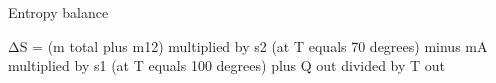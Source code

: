 Entropy balance  

ΔS = (m total plus m12) multiplied by s2 (at T equals 70 degrees) minus mA multiplied by s1 (at T equals 100 degrees) plus Q out divided by T out